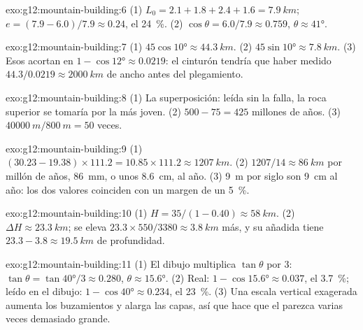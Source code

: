 \begin{solution}{exo:g12:mountain-building:6}
(1) $L_0 = 2.1 + 1.8 + 2.4 + 1.6 = \qty{7.9}{km}$;
$e = (7.9 - 6.0)/7.9 \approx 0.24$, el \qty{24}{\percent}. (2) $\cos\theta =
6.0/7.9 \approx 0.759$, $\theta \approx \ang{41}$.
\end{solution}

\begin{solution}{exo:g12:mountain-building:7}
(1) $45\cos\ang{10} \approx \qty{44.3}{km}$. (2) $45\sin\ang{10} \approx
\qty{7.8}{km}$. (3) Esos  acortan en $1 - \cos\ang{12} \approx 0.0219$:
el cinturón tendría que haber medido $44.3/0.0219 \approx \qty{2000}{km}$ de
ancho antes del plegamiento.
\end{solution}

\begin{solution}{exo:g12:mountain-building:8}
(1) La superposición: leída sin la falla, la roca superior se tomaría por la
más joven. (2) $500 - 75 = 425$ millones de años. (3) $\qty{40000}{m} /
\qty{800}{m} = 50$ veces.
\end{solution}

\begin{solution}{exo:g12:mountain-building:9}
(1) $(30.23 - 19.38) \times 111.2 = 10.85 \times 111.2 \approx
\qty{1207}{km}$. (2) $1207/14 \approx \qty{86}{km}$ por millón de años,
\qty{86}{mm}, o unos \qty{8.6}{cm}, al año. (3) \qty{9}{m} por siglo son
\qty{9}{cm} al año: los dos valores coinciden con un margen de un
\qty{5}{\percent}.
\end{solution}

\begin{solution}{exo:g12:mountain-building:10}
(1) $H = 35/(1 - 0.40) \approx \qty{58}{km}$. (2) $\Delta H \approx
\qty{23.3}{km}$; se eleva $23.3 \times 550/3380 \approx
\qty{3.8}{km}$ más, y su  añadida tiene $23.3 - 3.8 \approx \qty{19.5}{km}$ de profundidad.
\end{solution}

\begin{solution}{exo:g12:mountain-building:11}
(1) El dibujo multiplica $\tan\theta$ por 3: $\tan\theta = \tan\ang{40}/3
\approx 0.280$, $\theta \approx \ang{15.6}$. (2) Real: $1 - \cos\ang{15.6}
\approx 0.037$, el \qty{3.7}{\percent}; leído en el dibujo: $1 - \cos\ang{40}
\approx 0.234$, el \qty{23}{\percent}. (3) Una escala vertical exagerada
aumenta los buzamientos y alarga las capas, así que hace que el 
parezca varias veces demasiado grande.
\end{solution}

